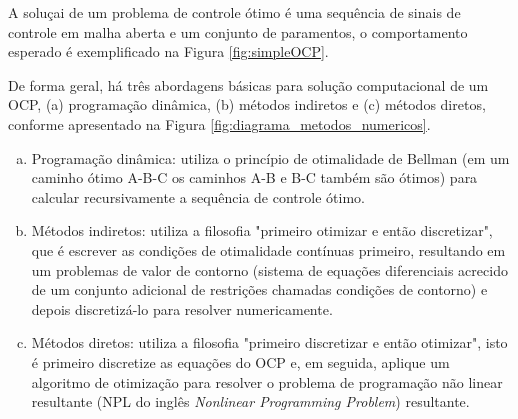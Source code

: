 A soluçai de um problema de controle ótimo é uma sequência de sinais de controle em malha aberta e um conjunto de paramentos, o comportamento esperado é
exemplificado na Figura \ref{fig:simpleOCP}.

De forma geral, há três abordagens básicas para solução computacional de um OCP, (a) programação dinâmica, (b) métodos indiretos e (c) métodos diretos, 
conforme apresentado na Figura \ref{fig:diagrama_metodos_numericos}.

\begin{enumerate}[(a)]
	\item Programação dinâmica: utiliza o princípio de otimalidade de Bellman (em um caminho ótimo A-B-C os caminhos A-B e B-C também são ótimos) para calcular recursivamente a sequência de controle ótimo. 
	\item Métodos indiretos: utiliza a filosofia "primeiro otimizar e então discretizar", que é escrever as condições de otimalidade contínuas primeiro,
		resultando em um problemas de valor de contorno (sistema de equações diferenciais acrecido de um conjunto adicional de restrições chamadas condições de contorno) e depois discretizá-lo para resolver numericamente.
	\item Métodos diretos: utiliza a filosofia "primeiro discretizar e então otimizar", isto é primeiro discretize as equações do OCP e, em seguida, aplique um algoritmo de otimização para resolver o problema de programação 
	não linear resultante (NPL do inglês \textit{Nonlinear Programming Problem}) resultante.
\end{enumerate}

